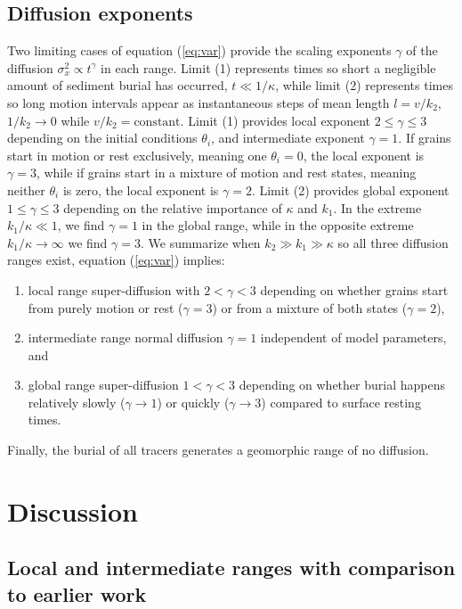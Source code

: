 \documentclass[grl]{agujournal2018}
\begin{document}
\subsection{Diffusion exponents}

Two limiting cases of equation (\ref{eq:var}) provide the scaling exponents $\gamma$ of the diffusion $\sigma_x^2 \propto t^\gamma$ in each range. Limit (1) represents times so short a negligible amount of sediment burial has occurred, $t\ll 1/\kappa$, while limit (2) represents times so long motion intervals appear as instantaneous steps of mean length $l=v/k_2$, $1/k_2 \rightarrow 0$ while $v/k_2 = \text{constant}$.
Limit (1) provides local exponent $2 \leq \gamma \leq 3$ depending on the initial conditions $\theta_i$, and intermediate exponent $\gamma=1$.
If grains start in motion or rest exclusively, meaning one $\theta_i = 0$, the local exponent is $\gamma=3$, while if grains start in a mixture of motion and rest states, meaning neither $\theta_i$ is zero, the local exponent is $\gamma=2$.
Limit (2) provides global exponent $1 \leq \gamma \leq 3$ depending on the relative importance of $\kappa$ and $k_1$.
In the extreme $k_1/\kappa \ll 1$, we find $\gamma=1$ in the global range, while in the opposite extreme $k_1/\kappa \rightarrow \infty$ we find $\gamma=3$.
We summarize when $k_2\gg k_1 \gg \kappa$ so all three diffusion ranges exist, equation (\ref{eq:var}) implies:
\begin{enumerate}
\item local range super-diffusion with $2<\gamma<3$ depending on whether grains start from purely motion or rest ($\gamma=3$) or from a mixture of both states ($\gamma=2$),
\item intermediate range normal diffusion $\gamma=1$ independent of model parameters, and
\item global range super-diffusion $1<\gamma<3$ depending on whether burial happens relatively slowly ($\gamma \rightarrow 1$) or quickly ($\gamma \rightarrow 3$) compared to surface resting times.
\end{enumerate}
Finally, the burial of all tracers generates a geomorphic range of no diffusion.

\section{Discussion}
\label{sec:discussion}

\subsection{Local and intermediate ranges with comparison to earlier work}
\end{document}
